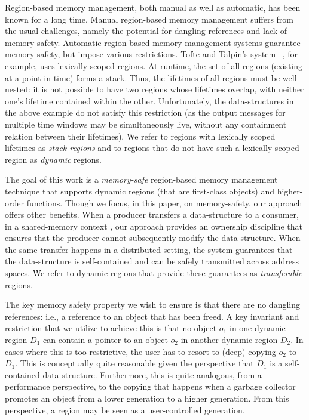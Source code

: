 Region-based memory management, both manual as well as automatic, has been known for
a long time. Manual region-based memory management suffers from the usual challenges,
namely the potential for dangling references and lack of memory safety. Automatic
region-based memory management systems guarantee memory safety, but impose various restrictions.
Tofte and Talpin's system~\cite{tofte94,tofte97} , for example, uses lexically scoped regions.
At runtime, the set of all regions (existing at a point in time) forms a stack. Thus, the lifetimes of
all regions must be well-nested: it is not possible to have two regions whose lifetimes
overlap, with neither one's lifetime contained within the other.
Unfortunately, the data-structures in the above example do not satisfy this restriction
(as the output messages for multiple time windows may be simultaneously live, without
any containment relation between their lifetimes).
We refer to regions with lexically scoped lifetimes as \emph{stack regions} and to regions 
that do not have such a lexically scoped region as \emph{dynamic} regions.

The goal of this work is a \emph{memory-safe} region-based memory management technique
that supports dynamic regions (that are first-class objects) and higher-order functions.
Though we focus, in this paper, on memory-safety, our approach offers other benefits.
When a producer transfers a data-structure to a consumer, in a shared-memory context , our approach
provides an ownership discipline that ensures that the producer cannot subsequently modify
the data-structure. When the same transfer happens in a distributed setting, the system guarantees
that the data-structure is self-contained and can be safely transmitted across address spaces.
We refer to dynamic regions that provide these guarantees as \emph{transferable} regions.

The key memory safety property we wish to ensure is that there are no dangling references:
i.e., a reference to an object that has been freed.
A key invariant and restriction that we utilize to achieve this is that no object $o_1$ in one dynamic
region $D_1$ can contain a pointer to an object $o_2$ in another dynamic region $D_2$.
In cases where this is too restrictive, the user has to resort to (deep) copying $o_2$ to $D_1$.
This is conceptually quite reasonable given the perspective that $D_1$ is a self-contained data-structure.
Furthermore, this is quite analogous, from a performance perspective, to the copying that happens
when a garbage collector promotes an object from a lower generation to a higher generation.
From this perspective, a region may be seen as a user-controlled generation.

